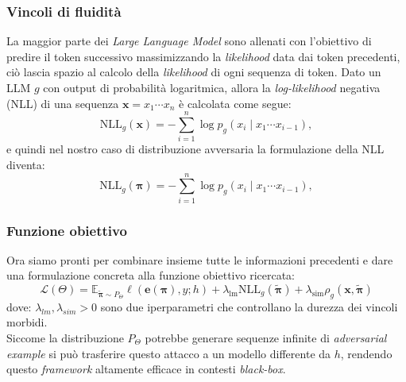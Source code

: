 \subsubsection{Vincoli di fluidit\`a}
La maggior parte dei \emph{Large Language Model} sono allenati con l'obiettivo di predire il token successivo massimizzando la \emph{likelihood} data dai token precedenti, ci\`o lascia spazio al calcolo della \emph{likelihood} di ogni sequenza di token. Dato un LLM \(g\) con output di probabilit\`a logaritmica, allora la \emph{log-likelihood} negativa (NLL) di una sequenza \(\textbf{x}=x_1\cdots x_n\) \`e calcolata come segue:
\begin{equation}
\text{NLL}_g(\mathbf{x}) = -\sum_{i=1}^n \log p_g(x_i \mid x_1 \cdots x_{i-1}),
\end{equation}
e quindi nel nostro caso di distribuzione avversaria la formulazione della NLL diventa:
\begin{equation} 
\text{NLL}_g(\mathbf{\pi}) = -\sum_{i=1}^n \log p_g(x_i \mid x_1 \cdots x_{i-1}),
\end{equation}

\subsubsection{Funzione obiettivo}
Ora siamo pronti per combinare insieme tutte le informazioni precedenti e dare una formulazione concreta alla funzione obiettivo ricercata:
\begin{equation} 
\mathcal{L}(\Theta) = \mathbb{E}_{\tilde{\mathbf{\pi}} \sim P_{\Theta}}\ell(\boldsymbol{e}(\boldsymbol{\pi}), y; h) + \lambda_{\text{lm}} \text{NLL}_g(\boldsymbol{\tilde{\pi}}) + \lambda_{\text{sim}} \rho_g(\mathbf{x}, \boldsymbol{\tilde{\pi}})
\end{equation}
dove: \(\lambda_{lm},\lambda_{sim}>0\) sono due iperparametri che controllano la durezza dei vincoli morbidi.\\
Siccome la distribuzione \(P_\Theta\) potrebbe generare sequenze infinite di \emph{adversarial example} si pu\`o trasferire questo attacco a un modello differente da \(h\), rendendo questo \emph{framework} altamente efficace in contesti \emph{black-box}.

